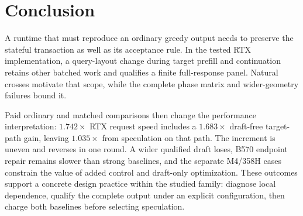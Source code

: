 \section{Conclusion}
A runtime that must reproduce an ordinary greedy output needs to preserve the stateful transaction as well as its acceptance rule. In the tested RTX implementation, a query-layout change during target prefill and continuation retains other batched work and qualifies a finite full-response panel. Natural crosses motivate that scope, while the complete phase matrix and wider-geometry failures bound it.

Paid ordinary and matched comparisons then change the performance interpretation: $1.742\times$ RTX request speed includes a $1.683\times$ draft-free target-path gain, leaving $1.035\times$ from speculation on that path. The increment is uneven and reverses in one round. A wider qualified draft loses, B570 endpoint repair remains slower than strong baselines, and the separate M4/358H cases constrain the value of added control and draft-only optimization. These outcomes support a concrete design practice within the studied family: diagnose local dependence, qualify the complete output under an explicit configuration, then charge both baselines before selecting speculation.

